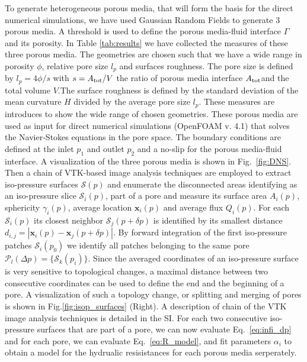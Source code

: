\documentclass[draft]{agujournal2019}
\begin{document}
To generate heterogeneous porous media, that will form the basis for the direct numerical simulations, we have used Gaussian Random Fields to generate 3 porous media. A threshold is used to define the porous media-fluid interface $\Gamma$ and its porosity. In Table \ref{tab:results} we have collected the measures of these three porous media. The geometries are chosen such that we have a wide range in porosity $\phi$, relative pore size $l_p$ and surfaces roughness. The pore size is defined by $l_p = 4 \phi/s$ with $s= A_{\rm{tot}}/V$ the ratio of porous media interface $A_{\rm{tot}}$and the total volume $V$.The surface roughness is defined by the standard deviation of the mean curvature $H$ divided by the average pore size $l_p$. These measures are introduces to show the wide range of chosen geometries. These porous media are used as input for direct numerical simulations (OpenFOAM v. 4.1) \cite{weller_tensorial_1998} that solves the Navier-Stokes equations in the pore space. The boundary conditions are defined at the inlet $p_1$ and outlet $p_2$ and a no-slip for the porous media-fluid interface. A visualization of the three porous media is shown in Fig.~\ref{fig:DNS}. Then a chain of VTK-based image analysis techniques  are employed to extract iso-pressure surfaces $\mathcal{S}(p)$ and enumerate the disconnected areas identifying as an iso-pressure slice $\mathcal{S}_i(p)$, part of a pore and measure its surface area $A_i(p)$, sphericity $\gamma_i(p)$, average location $\mathbf{x}_i(p)$ and average flux $Q_i(p)$. For each $\mathcal{S}_i(p)$ its closest neighbor $\mathcal{S}_j(p+\delta p)$ is identified by its smallest distance $d_{i,j}= \left|  \mathbf{x}_i(p)-\mathbf{x}_j(p+\delta p)\right|$. By forward integration of the first iso-pressure patches $\mathcal{S}_i(p_0)$ we identify all patches belonging to the same pore $\mathcal{P}_l(\Delta p) = \{\mathcal{S}_k(p_i)\}$. Since the averaged coordinates of an iso-pressure surface is very sensitive to topological changes, a maximal distance between two consecutive coordinates can be used to define the end and the beginning of a pore. A visualization of such a topology change, or splitting and merging of pores is shown in Fig.\ref{fig:isop_surfaces} (Right). A description of chain of the VTK image analysis techniques is detailed in the SI. For each two consecutive iso-pressure surfaces that are part of a pore, we can now evaluate Eq.~\ref{eq:infi_dp} and for each pore, we can evaluate Eq.~\ref{eq:R_model}, and fit parameters $\alpha_i$ to obtain a model for the hydrualic resisistances for each porous media serperately. 
\end{document}
